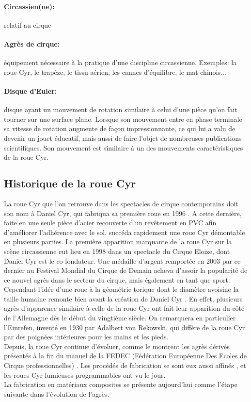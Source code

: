 \paragraph{Circassien(ne):} relatif au cirque 
\paragraph{Agrès de cirque:} équipement nécessaire à la pratique d'une discipline circassienne. Exemples: la roue Cyr, le trapèze, le tissu aérien, les cannes d'équilibre, le mat chinois...
\paragraph{Disque d'Euler:} disque ayant un mouvement de rotation similaire à celui d'une pièce qu'on fait tourner sur une surface plane. Lorsque son mouvement entre en phase terminale sa vitesse de rotation augmente de façon impressionnante, ce qui lui a valu de devenir un jouet éducatif, mais aussi de faire l'objet de nombreuses publications scientifiques. Son mouvement est similaire à un des mouvements caractéristiques de la roue Cyr.


\subsection{Historique de la roue Cyr}
La roue Cyr que l'on retrouve dans les spectacles de cirque contemporains doit son  nom à Daniel Cyr, qui fabriqua sa première roue en 1996 \cite{Inertie}. A cette dernière, faite en une seule pièce d'acier recouverte d'un revêtement en PVC afin d'améliorer l'adhérence avec le sol, succéda rapidement  une roue Cyr démontable en plusieurs parties. La première apparition marquante de la roue Cyr sur la scène circassienne eut lieu en 1998 dans un spectacle du Cirque Eloize, dont Daniel Cyr est le co-fondateur. Une médaille d'argent remportée en 2003 par ce dernier au Festival Mondial du Cirque de Demain acheva d'assoir la popularité de ce nouvel agrès dans le secteur du cirque, mais également en tant que sport.\\
Cependant l'idée d'une roue à la géométrie torique dont le diamètre avoisine la taille humaine remonte bien avant la création de Daniel Cyr \cite{Inertiehist,gymmedia,howstuffwork}. En effet, plusieurs agrès d'apparence similaire à celle de la roue Cyr ont fait leur apparition du côté de l'Allemagne dès le début du vingtième siècle. On remarquera en particulier l'Einrefen, inventé en 1930 par Adalbert von Rekowski, qui diffère de la roue Cyr par des poignées intérieures pour les mains et les pieds. \\
Depuis, la roue Cyr continue d'évoluer, comme le montrent les agrès dérivés présentés à la fin du manuel de la FEDEC (Fédération Européenne Des Ecoles de Cirque professionnelles) \cite{Fedec2011}. Les procédés de fabrication se sont eux aussi affinés \cite{corbin}, et les roues Cyr lumieuses programmables ont vu le jour.\\
La fabrication en matériaux composites se présente aujourd'hui comme l'étape suivante dans l'évolution de l'agrès.

